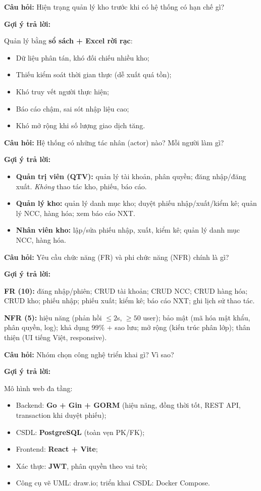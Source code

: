 \documentclass[12pt,a4paper]{article}
\newcommand{\cau}[1]{\textbf{\textcolor{qblue}{Câu hỏi:}} #1}
\newcommand{\traloi}{\par\smallskip\textbf{\textcolor{qblue!70!black}{Gợi ý trả lời:}}\par}
\begin{document}
\begin{cauhoi}[Câu 3]
\cau{Hiện trạng quản lý kho trước khi có hệ thống có hạn chế gì?}
\traloi
Quản lý bằng \textbf{sổ sách + Excel rời rạc}:
\begin{itemize}[leftmargin=1.4em,itemsep=2pt]
  \item Dữ liệu phân tán, khó đối chiếu nhiều kho;
  \item Thiếu kiểm soát thời gian thực (dễ xuất quá tồn);
  \item Khó truy vết người thực hiện;
  \item Báo cáo chậm, sai sót nhập liệu cao;
  \item Khó mở rộng khi số lượng giao dịch tăng.
\end{itemize}
\end{cauhoi}

\begin{cauhoi}[Câu 4]
\cau{Hệ thống có những tác nhân (actor) nào? Mỗi người làm gì?}
\traloi
\begin{itemize}[leftmargin=1.4em,itemsep=2pt]
  \item \textbf{Quản trị viên (QTV):} quản lý tài khoản, phân quyền; đăng nhập/đăng xuất. \emph{Không} thao tác kho, phiếu, báo cáo.
  \item \textbf{Quản lý kho:} quản lý danh mục kho; duyệt phiếu nhập/xuất/kiểm kê; quản lý NCC, hàng hóa; xem báo cáo NXT.
  \item \textbf{Nhân viên kho:} lập/sửa phiếu nhập, xuất, kiểm kê; quản lý danh mục NCC, hàng hóa.
\end{itemize}
\end{cauhoi}

\begin{cauhoi}[Câu 5]
\cau{Yêu cầu chức năng (FR) và phi chức năng (NFR) chính là gì?}
\traloi
\textbf{FR (10):} đăng nhập/phiên; CRUD tài khoản; CRUD NCC; CRUD hàng hóa; CRUD kho; phiếu nhập; phiếu xuất; kiểm kê; báo cáo NXT; ghi lịch sử thao tác.

\textbf{NFR (5):} hiệu năng (phản hồi $\leq 2$s, $\geq 50$ user); bảo mật (mã hóa mật khẩu, phân quyền, log); khả dụng 99\% + sao lưu; mở rộng (kiến trúc phân lớp); thân thiện (UI tiếng Việt, responsive).
\end{cauhoi}

\begin{cauhoi}[Câu 6]
\cau{Nhóm chọn công nghệ triển khai gì? Vì sao?}
\traloi
Mô hình web đa tầng:
\begin{itemize}[leftmargin=1.4em,itemsep=2pt]
  \item Backend: \textbf{Go + Gin + GORM} (hiệu năng, đồng thời tốt, REST API, transaction khi duyệt phiếu);
  \item CSDL: \textbf{PostgreSQL} (toàn vẹn PK/FK);
  \item Frontend: \textbf{React + Vite};
  \item Xác thực: \textbf{JWT}, phân quyền theo vai trò;
  \item Công cụ vẽ UML: draw.io; triển khai CSDL: Docker Compose.
\end{itemize}
\end{cauhoi}
\end{document}
